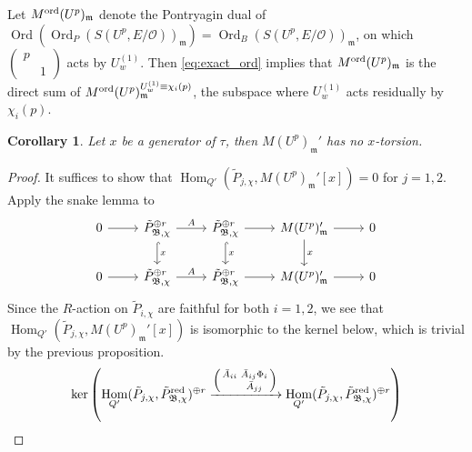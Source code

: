 \documentclass[leqno]{amsart}
\newtheorem{cor}[thm]{Corollary}
\theoremstyle{definition}
\theoremstyle{remark}
\newcommand{\smat}[1]{\left(\begin{smallmatrix} #1 \end{smallmatrix}\right)}
\newcommand{\oo}{\mathcal{O}}
\DeclareMathOperator{\Hom}{Hom}
\newcommand{\fm}{\mathfrak{m}}
\DeclareMathOperator{\Ord}{Ord} %
\newcommand{\B}{\mathfrak B} %
\newcommand{\red}{\textnormal{red}}
\newcommand{\ord}{\textnormal{ord}} %
\begin{document}
Let $M^{\ord}(U^p)_\fm$
denote the Pontryagin dual
of $\Ord(\Ord_P(S(U^p,E/\oo))_{\fm})=\Ord_B(S(U^p,E/\oo))_{\fm}$,
on which $\smat{p&\\&1}$ acts by  $U_{w}^{(1)}$.
Then \eqref{eq:exact_ord}
implies that 
$M^{\ord}(U^p)_{\fm}$ is the direct sum of 
$M^{\ord}(U^p)_{\fm}^{U_{w}^{(1)}\equiv \chi_i(p)}$,
the subspace where $U_{w}^{(1)}$ acts residually by $\chi_i(p)$.

\begin{cor}\label{cor:no_torsion}
	Let $x$ be a generator
	of $\tau$, then $M(U^p)_{\fm}'$
	has no $x$-torsion.
\end{cor}
\begin{proof}
	It suffices to show that
	$\Hom_{Q'}(\tilde{P}_{j,\chi}, M(U^p)_{\fm}'[x])=0$
	for $j=1,2$.
	Apply the snake lemma to
    \begin{equation*}
    \begin{tikzcd}
        0 \arrow[r] & \tilde{P}_{\B,\chi}^{\oplus r} 
	\arrow[d,"x",hookrightarrow] \arrow[r,"A"] & 
	\tilde{P}_{\B,\chi}^{\oplus r} 
	\arrow[d,"x",hookrightarrow] \arrow[r] & 
	M(U^p)_{\fm}'\arrow[d,"x"] \arrow[r] & 0 \\ 
        0 \arrow[r] & \tilde{P}_{\B,\chi}^{\oplus r}
	\arrow[r,"A"] & \tilde{P}_{\B,\chi}^{\oplus r}
	\arrow[r] &M(U^p)_{\fm}'  \arrow[r] & 0 
    \end{tikzcd}
\end{equation*}
Since the $R$-action
on $\tilde{P}_{i,\chi}$ are faithful for both $i=1,2$,
we see that $\Hom_{Q'}(\tilde{P}_{j,\chi}, M(U^p)_{\fm}'[x])$
is isomorphic to the kernel below,
which is trivial by the previous proposition.
\[
	\ker\left(
	\Hom_{Q'}(\tilde{P}_{j,\chi}, 
	\tilde{P}_{\B,\chi}^{\red})^{\oplus r}
	\xrightarrow{\smat{\bar{A}_{ii}& \bar{A}_{ij}\Phi_{i}\\& \bar{A}_{jj}}}
	\Hom_{Q'}(\tilde{P}_{j,\chi}, 
	\tilde{P}_{\B,\chi}^{\red})^{\oplus r}\right)
\]
\end{proof}
\end{document}
